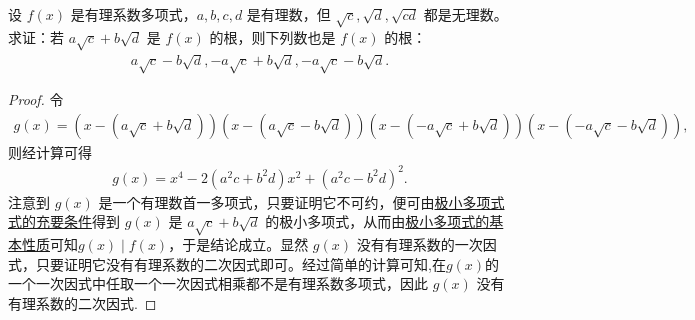 \documentclass[../../main.tex]{subfiles}%
\begin{document}
\begin{example}
设 $f(x)$ 是有理系数多项式，$a, b, c, d$ 是有理数，但 $\sqrt{c}, \sqrt{d}, \sqrt{cd}$ 都是无理数。求证：若 $a\sqrt{c} + b\sqrt{d}$ 是 $f(x)$ 的根，则下列数也是 $f(x)$ 的根：
\begin{align*}
a\sqrt{c} - b\sqrt{d}, -a\sqrt{c} + b\sqrt{d}, -a\sqrt{c} - b\sqrt{d}.
\end{align*}
\end{example}
\begin{proof}
令
\begin{align*}
g(x) = (x - (a\sqrt{c} + b\sqrt{d}))(x - (a\sqrt{c} - b\sqrt{d}))(x - (-a\sqrt{c} + b\sqrt{d}))(x - (-a\sqrt{c} - b\sqrt{d})),
\end{align*}
则经计算可得
\begin{align*}
g(x) = x^4 - 2(a^2 c + b^2 d)x^2 + (a^2 c - b^2 d)^2.
\end{align*}
注意到 $g(x)$ 是一个有理数首一多项式，只要证明它不可约，便可由\hyperref[proposition:极小多项式式的充要条件]{极小多项式式的充要条件}得到 $g(x)$ 是 $a\sqrt{c} + b\sqrt{d}$ 的极小多项式，从而由\hyperref[proposition:极小多项式的基本性质]{极小多项式的基本性质}可知$g(x) \mid f(x)$，于是结论成立。显然 $g(x)$ 没有有理系数的一次因式，只要证明它没有有理系数的二次因式即可。经过简单的计算可知,在$g(x)$的一个一次因式中任取一个一次因式相乘都不是有理系数多项式，因此 $g(x)$ 没有有理系数的二次因式.
\end{proof}
\end{document}
